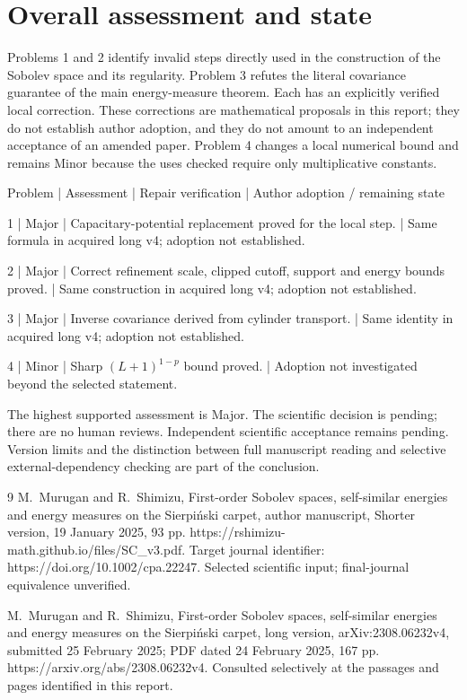 \documentclass[10pt]{article}
\begin{document}
\section*{Overall assessment and state}
Problems 1 and 2 identify invalid steps directly used in the construction of the Sobolev space and its regularity. Problem 3 refutes the literal covariance guarantee of the main energy-measure theorem. Each has an explicitly verified local correction. These corrections are mathematical proposals in this report; they do not establish author adoption, and they do not amount to an independent acceptance of an amended paper. Problem 4 changes a local numerical bound and remains Minor because the uses checked require only multiplicative constants.\par
Problem | Assessment | Repair verification | Author adoption / remaining state\par
1 | Major | Capacitary-potential replacement proved for the local step. | Same formula in acquired long v4; adoption not established.\par
2 | Major | Correct refinement scale, clipped cutoff, support and energy bounds proved. | Same construction in acquired long v4; adoption not established.\par
3 | Major | Inverse covariance derived from cylinder transport. | Same identity in acquired long v4; adoption not established.\par
4 | Minor | Sharp \((L+1)^{1-p}\) bound proved. | Adoption not investigated beyond the selected statement.\par
The highest supported assessment is Major. The scientific decision is pending; there are no human reviews. Independent scientific acceptance remains pending. Version limits and the distinction between full manuscript reading and selective external-dependency checking are part of the conclusion.\par
9 M. Murugan and R. Shimizu, First-order Sobolev spaces, self-similar energies and energy measures on the Sierpiński carpet, author manuscript, Shorter version, 19 January 2025, 93 pp. https://rshimizu-math.github.io/files/SC\_v3.pdf. Target journal identifier: https://doi.org/10.1002/cpa.22247. Selected scientific input; final-journal equivalence unverified.\par
M. Murugan and R. Shimizu, First-order Sobolev spaces, self-similar energies and energy measures on the Sierpiński carpet, long version, arXiv:2308.06232v4, submitted 25 February 2025; PDF dated 24 February 2025, 167 pp. https://arxiv.org/abs/2308.06232v4. Consulted selectively at the passages and pages identified in this report.\par
\end{document}
